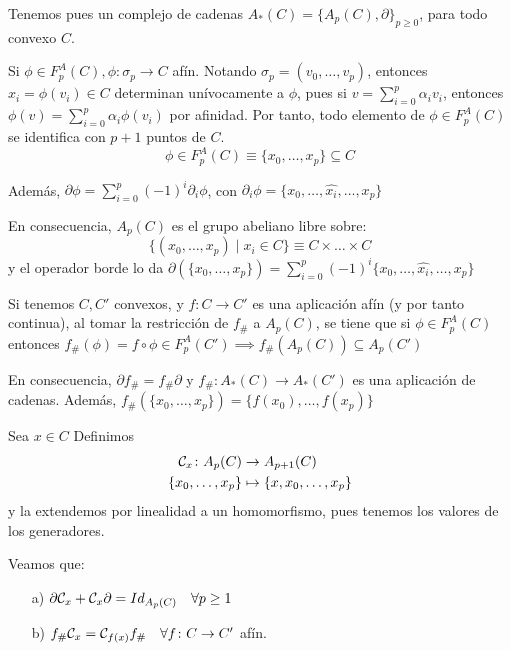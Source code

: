Tenemos pues un complejo de cadenas $A_*(C) = \{A_p(C), \partial\}_{p \geq 0}$, para todo convexo $C$.

Si $\phi \in F_p^A(C), \phi \colon \sigma_p \to C$ afín. Notando $\sigma_p = (v_0, \dots, v_p)$, entonces
${x_i = \phi(v_i) \in C}$ determinan unívocamente a $\phi$, pues si $v = \sum\limits_{i = 0}^p \alpha_i v_i$, entonces
$\phi(v) = \sum\limits_{i = 0}^p \alpha_i \phi(v_i)$ por afinidad. Por tanto, todo elemento de $\phi \in F_p^A(C)$ se
identifica con $p+1$ puntos de $C$.
\[\phi \in F_p^A(C) \equiv \{x_0, \dots, x_p\} \subseteq C\]

Además, $\partial \phi = \sum\limits_{i = 0}^p (-1)^i \partial_i \phi$, con $\partial_i \phi = \{x_0, \dots, \hat{x_i}, \dots, x_p\}$

En consecuencia, $A_p(C)$ es el grupo abeliano libre sobre:
\[\{(x_0, \dots, x_p) \mid x_i \in C\} \equiv C \times \dots \times C \]
y el operador borde lo da $\partial(\{x_0, \dots, x_p\}) = \sum\limits_{i = 0}^p (-1)^i \{x_0, \dots, \hat{x_i}, \dots, x_p\}$

Si tenemos $C, C'$ convexos, y $f \colon C \to C'$ es una aplicación afín (y por tanto continua), al tomar la restricción de $f_\#$
a $A_p(C)$, se tiene que si ${\phi \in F_p^A(C)}$ entonces $f_\#(\phi) = {f \circ \phi \in F_p^A(C')} \implies {f_\#(A_p(C)) \subseteq A_p(C')}$

En consecuencia, $\partial f_\# = f_\# \partial$ y $f_\# \colon A_*(C) \to A_*(C')$ es una aplicación de cadenas. Además,
${f_\#(\{x_0, \dots, x_p\}) = \{f(x_0), \dots, f(x_p)\}}$

\begin{definition}
  Sea $x \in C$ Definimos
  \begin{align*}
    {\mathcal C}_x \colon A_p(C) &\to A_{p+1}(C) \\
    \{x_0, \dots, x_p\} &\mapsto \{x, x_0, \dots, x_p\}
  \end{align*}
  y la extendemos por linealidad a un homomorfismo, pues tenemos los valores de los generadores.
\end{definition}

\begin{proposition}
  Veamos que:
  \begin{itemize}
    \item[a)] $\partial {\mathcal C}_x + {\mathcal C}_x \partial = Id_{A_p(C)} \quad \forall p \geq 1$
    \item[b)] $f_\# {\mathcal C}_x = {\mathcal C}_{f(x)} f_\# \quad \forall f \colon C \to C'$ afín.
  \end{itemize}
\end{proposition}

